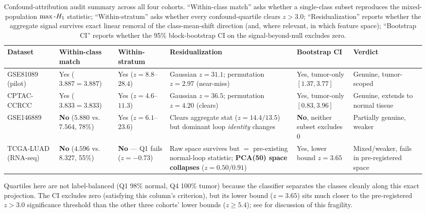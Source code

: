 \begin{table}[htbp]
\centering
\scriptsize
\caption{Confound-attribution audit summary across all four cohorts. ``Within-class match'' asks whether a
single-class subset reproduces the mixed-population $\max\text{-}H_1$ statistic; ``Within-stratum'' asks whether
every confound-quartile clears $z>3.0$; ``Residualization'' reports whether the aggregate signal survives
exact linear removal of the class-mean-shift direction (and, where relevant, in which feature space);
``Bootstrap CI'' reports whether the 95\% block-bootstrap CI on the signal-beyond-null excludes zero.}
\label{tab:confound-crossdataset}
\begin{tabular}{@{}p{2.1cm}p{2.3cm}p{2.0cm}p{3.3cm}p{2.2cm}p{2.3cm}@{}}
\toprule
Dataset & Within-class match & Within-stratum & Residualization & Bootstrap CI & Verdict \\
\midrule
GSE81089 (pilot) & Yes ($3.887=3.887$) & Yes ($z{=}8.8$--$28.4$) & Gaussian $z{=}31.1$; permutation $z{=}2.97$ (near-miss) & Yes, tumor-only $[1.37,3.77]$ & Genuine, tumor-scoped \\
CPTAC-CCRCC & Yes ($3.833=3.833$) & Yes ($z{=}4.6$--$11.3$) & Gaussian $z{=}36.5$; permutation $z{=}4.20$ (clears) & Yes, tumor-only $[0.83,3.96]$ & Genuine, extends to normal tissue \\
GSE146889 & \textbf{No} ($5.880$ vs.\ $7.564$, 78\%) & Yes ($z{=}6.1$--$23.6$)\footnotemark[1] & Clears aggregate stat ($z{=}14.4/13.5$) but dominant loop \emph{identity} changes & \textbf{No}, neither subset excludes 0 & Partially genuine, weaker \\
TCGA-LUAD (RNA-seq) & \textbf{No} ($4.596$ vs.\ $8.327$, 55\%) & \textbf{No} --- Q1 fails ($z{=}-0.73$) & Raw space survives but $=$ pre-existing normal-loop statistic; \textbf{PCA(50) space collapses} ($z{=}0.50/0.91$) & Yes, lower bound $z{=}3.65$\footnotemark[2] & Mixed/weaker, fails in pre-registered space \\
\bottomrule
\end{tabular}
\vspace{2pt}
\footnotesize{\footnotemark[1]Quartiles here are not label-balanced (Q1 98\% normal, Q4 100\% tumor) because the classifier separates the classes cleanly along this exact projection. \footnotemark[2]The CI excludes zero (satisfying this column's criterion), but its lower bound ($z=3.65$) sits much closer to the pre-registered $z>3.0$ significance threshold than the other three cohorts' lower bounds ($z\geq5.4$); see  for discussion of this fragility.}
\end{table}

